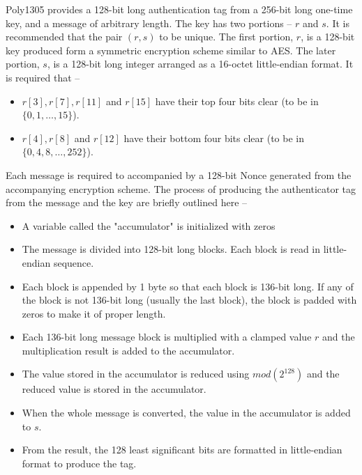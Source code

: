 \documentclass[a4paper]{cas-sc}
\begin{document}
Poly1305 provides a 128-bit long authentication tag from a 256-bit long one-time key, and a message of arbitrary length. The key has two portions -- $r$ and $s$. It is recommended that the pair $(r,s)$ to be unique. The first portion, $r$, is a 128-bit key produced form a symmetric encryption scheme similar to AES. The later portion, $s$, is a 128-bit long integer arranged as a 16-octet little-endian format. It is required that --
\begin{itemize}
    \item $r[3], r[7], r[11]$ and $r[15]$ have their top four bits clear (to be in $\{0,1,\ldots,15\}$).
    \item $r[4], r[8]$ and $r[12]$ have their bottom four bits clear (to be in $\{0,4,8,\ldots,252\}$).
\end{itemize}

Each message is required to accompanied by a 128-bit Nonce generated from the accompanying encryption scheme. The process of producing the authenticator tag from the message and the key are briefly outlined here --
\begin{itemize}
    \item A variable called the "accumulator" is initialized with zeros
    \item The message is divided into 128-bit long blocks. Each block is read in little-endian sequence.
    \item Each block is appended by 1 byte so that each block is 136-bit long. If any of the block is not 136-bit long (usually the last block), the block is padded with zeros to make it of proper length.
    \item Each 136-bit long message block is multiplied with a clamped value $r$ and the multiplication result is added to the accumulator.
    \item The value stored in the accumulator is reduced using $mod(2^{128})$ and the reduced value is stored in the accumulator.
    \item When the whole message is converted, the value in the accumulator is added to $s$.
    \item From the result, the 128 least significant bits are formatted in little-endian format to produce the tag.
\end{itemize}
\end{document}
